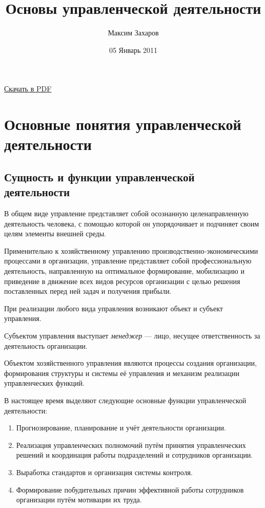 \documentclass[12pt, russian, oneside, article]{ncc}
\begin{document}
\title{Основы управленческой деятельности}
\author{Максим Захаров}
\date{05 Январь 2011}
\maketitle

\setcounter{tocdepth}{3}
\tableofcontents
\vspace*{1cm}

\href{file:///home/maxim/Documents/Git/zamal.github.com/pdf/OUD_Lectures.pdf}{Скачать в PDF}

\section{Основные понятия управленческой деятельности}
\label{sec-1}
\subsection{Сущность и функции управленческой деятельности}
\label{sec-1_1}


В общем виде управление представляет собой осознанную целенаправленную деятельность человека, с помощью которой он упорядочивает и подчиняет своим целям элементы внешней среды.

Применительно к хозяйственному управлению производственно-экономическими процессами в организации, управление представляет собой профессиональную деятельность, направленную на оптимальное формирование, мобилизацию и приведение в движение всех видов ресурсов организации с целью решения поставленных перед ней задач и получения прибыли.

При реализации любого вида управления возникают объект и субъект управления.

Субъектом управления выступает \emph{менеджер} --- лицо, несущее ответственность за деятельность организации.

Объектом хозяйственного управления являются процессы создания организации, формирования структуры и системы её управления и механизм реализации управленческих функций.

В настоящее время выделяют следующие основные функции управленческой деятельности:
\begin{enumerate}
\item Прогнозирование, планирование и учёт деятельности организации.
\item Реализация управленческих полномочий путём принятия управленческих решений и координация работы подразделений и сотрудников организации.
\item Выработка стандартов и организация системы контроля.
\item Формирование побудительных причин эффективной работы сотрудников организации путём мотивации их труда.
\end{enumerate}
\end{document}
